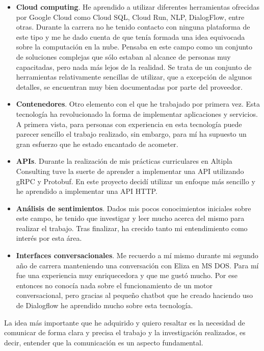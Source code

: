 \begin{itemize}
    \item \textbf{Cloud computing}. He aprendido a utilizar diferentes herramientas ofrecidas por Google Cloud como Cloud SQL, Cloud Run, NLP, DialogFlow, entre otras. Durante la carrera no he tenido contacto con ninguna plataforma de este tipo y me he dado cuenta de que tenía formada una idea equivocada sobre la computación en la nube. Pensaba en este campo como un conjunto de soluciones complejas que sólo estaban al alcance de personas muy capacitadas, pero nada más lejos de la realidad. Se trata de un conjunto de herramientas relativamente sencillas de utilizar, que a excepción de algunos detalles, se encuentran muy bien documentadas por parte del proveedor.
    
    \item \textbf{Contenedores}. Otro elemento con el que he trabajado por primera vez. Esta tecnología ha revolucionado la forma de implementar aplicaciones y servicios. A primera vista, para personas con experiencia en esta tecnología puede parecer sencillo el trabajo realizado, sin embargo, para mí ha supuesto un gran esfuerzo que he estado encantado de acometer.
    
    \item \textbf{APIs}. Durante la realización de mis prácticas curriculares en Altipla Consulting tuve la suerte de aprender a implementar una API utilizando gRPC y Protobuf. En este proyecto decidí utilizar un enfoque más sencillo y he aprendido a implementar una API HTTP.
    
    \item \textbf{Análisis de sentimientos}. Dados mis pocos conocimientos iniciales sobre este campo, he tenido que investigar y leer mucho acerca del mismo para realizar el trabajo. Tras finalizar, ha crecido tanto mi entendimiento como interés por esta área.
    
    \item \textbf{Interfaces conversacionales}. Me recuerdo a mí mismo durante mi segundo año de carrera manteniendo una conversación con Eliza en MS DOS. Para mí fue una experiencia muy enriquecedora y que me gustó mucho. Por ese entonces no conocía nada sobre el funcionamiento de un motor conversacional, pero gracias al pequeño chatbot que he creado haciendo uso de Dialogflow he aprendido mucho sobre esta tecnología.
\end{itemize}


La idea más importante que he adquirido y quiero resaltar es la necesidad de comunicar de forma clara y precisa el trabajo y la investigación realizados, es decir, entender que la comunicación es un aspecto fundamental. 

